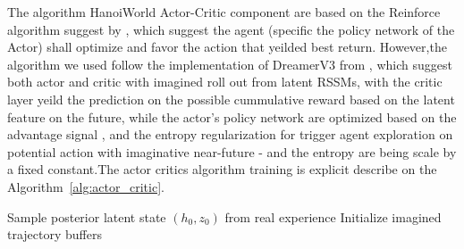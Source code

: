 The algorithm HanoiWorld Actor-Critic component are based on the Reinforce algorithm suggest by \cite{williams_1992_simple}, which suggest the agent (specific the policy network of the Actor) shall optimize and favor the action that yeilded best return. However,the algorithm we used follow the implementation of DreamerV3 from \cite{Hafner2023}, which suggest both actor and critic with imagined roll out from latent RSSMs, with the critic layer yeild the prediction on the possible cummulative reward based on the latent feature on the future, while the actor's policy network are optimized based on the advantage signal , and the entropy regularization for trigger agent exploration on potential action with imaginative near-future - and the entropy are being scale by a fixed constant.The actor critics algorithm training is explicit describe on the Algorithm~\ref{alg:actor_critic}.

\begin{algorithm}[htbp]
\caption{Actor--Critic Training via Imagined Rollouts}
\label{alg:actor_critic}

Sample posterior latent state $(h_0, z_0)$ from real experience\;
Initialize imagined trajectory buffers\;


\end{algorithm}


